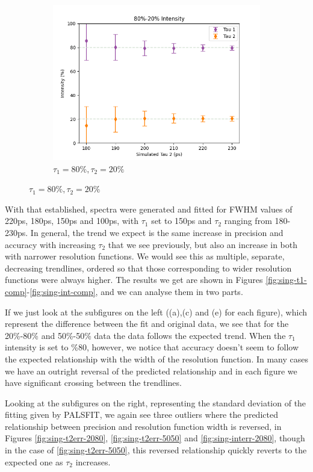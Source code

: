 \begin{figure}[p]
\begin{subfigure}{0.7\textwidth}
        \includegraphics[width=.95\textwidth]{Batch 3/single Gaussian IRF/gauss210/150/output/8020.png}
        \caption{$\tau_1 = 80\%, \tau_2 = 20\%$}
        \label{fig:sing-210-8020}
    \end{subfigure}
    \label{fig:sing-210}
\end{figure}

With that established, spectra were generated and fitted for FWHM values of 220ps, 180ps, 150ps and 100ps, with $\tau_1$ set to 150ps and $\tau_2$ ranging from 180-230ps. In general, the trend we expect is the same increase in precision and accuracy with increasing $\tau_2$ that we see previously, but also an increase in both with narrower resolution functions. We would see this as multiple, separate, decreasing trendlines, ordered so that those corresponding to wider resolution functions were always higher. The results we get are shown in Figures \ref{fig:sing-t1-comp}-\ref{fig:sing-int-comp}, and we can analyse them in two parts.

If we just look at the subfigures on the left ((a),(c) and (e) for each figure), which represent the difference between the fit and original data, we see that for the 20\%-80\% and 50\%-50\% data the data follows the expected trend. When the $\tau_1$ intensity is set to \%80, however, we notice that accuracy doesn't seem to follow the expected relationship with the width of the resolution function. In many cases we have an outright reversal of the predicted relationship and in each figure we have significant crossing between the trendlines.

Looking at the subfigures on the right, representing the standard deviation of the fitting given by PALSFIT, we again see three outliers where the predicted relationship between precision and resolution function width is reversed, in Figures \ref{fig:sing-t2err-2080}, \ref{fig:sing-t2err-5050} and \ref{fig:sing-interr-2080}, though in the case of \ref{fig:sing-t2err-5050}, this reversed relationship quickly reverts to the expected one as $\tau_2$ increases.



